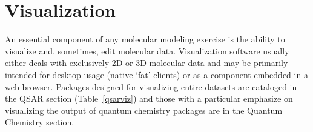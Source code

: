 \section{Visualization}
  
An essential component of any molecular modeling exercise is the ability to visualize and, sometimes, edit molecular data.  Visualization software usually either deals with exclusively 2D or 3D molecular data and may be primarily intended for desktop usage (native `fat' clients) or as a component embedded in a web browser.  Packages designed for visualizing entire datasets are cataloged in the QSAR section (Table~\ref{qsarviz}) and those with a particular emphasize on visualizing the output of quantum chemistry packages are in the Quantum Chemistry section.